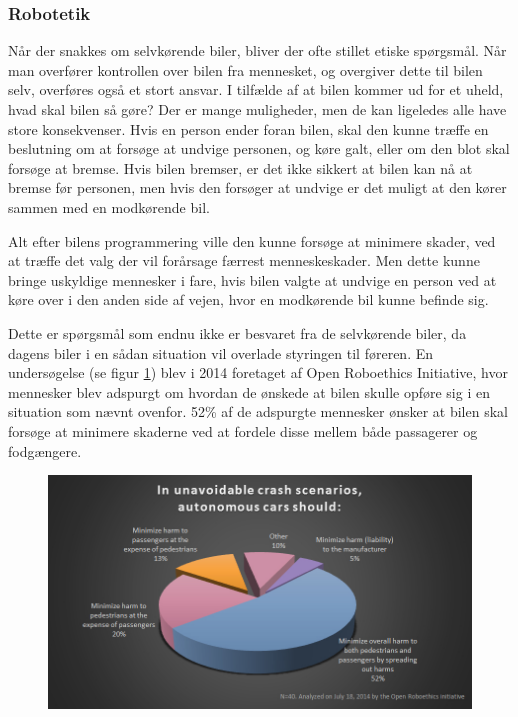 \subsubsection{Robotetik}
	Når der snakkes om selvkørende biler, bliver der ofte stillet etiske spørgsmål. Når man overfører kontrollen over bilen fra mennesket, og overgiver dette til bilen selv, overføres også et stort ansvar. I tilfælde af at bilen kommer ud for et uheld, hvad skal bilen så gøre? Der er mange muligheder, men de kan ligeledes alle have store konsekvenser. Hvis en person ender foran bilen, skal den kunne træffe en beslutning om at forsøge at undvige personen, og køre galt, eller om den blot skal forsøge at bremse. Hvis bilen bremser, er det ikke sikkert at bilen kan nå at bremse før personen, men hvis den forsøger at undvige er det muligt at den kører sammen med en modkørende bil. 

	Alt efter bilens programmering ville den kunne forsøge at minimere skader, ved at træffe det valg der vil forårsage færrest menneskeskader. Men dette kunne bringe uskyldige mennesker i fare, hvis bilen valgte at undvige en person ved at køre over i den anden side af vejen, hvor en modkørende bil kunne befinde sig. 
	
	Dette er spørgsmål som endnu ikke er besvaret fra de selvkørende biler, da dagens biler i en sådan situation vil overlade styringen til føreren. En undersøgelse (se figur \ref{fig:etik_accident}) blev i 2014 foretaget af Open Roboethics Initiative, hvor mennesker blev adspurgt om hvordan de ønskede at bilen skulle opføre sig i en situation som nævnt ovenfor. 52\% af de adspurgte mennesker ønsker at bilen skal forsøge at minimere skaderne ved at fordele disse mellem både passagerer og fodgængere. 
	\begin{figure}[h!]
		\centering
		\includegraphics[width=\textwidth]{images/roboethics-2.jpg}
		\label{fig:etik_accident}
	\end{figure}
	
